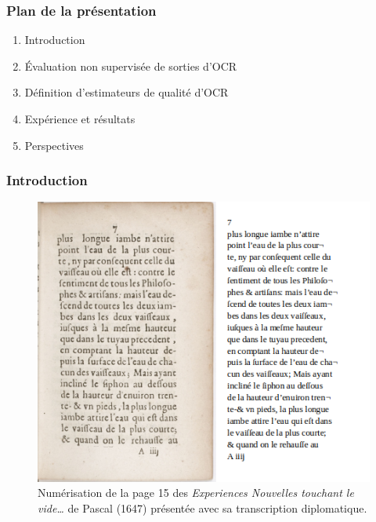 \documentclass{beamer}
\author{Jean-Baptiste Tanguy}
\institute{CELLF, STIH, Sorbonne Université}
\begin{document}
	\begin{frame}
	\maketitle
	\end{frame}

	\begin{frame}
	\frametitle{Plan de la présentation}
	\begin{enumerate}
		\item Introduction
		\item \'{E}valuation non supervisée de sorties d'OCR
		\item Définition d'estimateurs de qualité d'OCR
		\item Expérience et résultats
		\item Perspectives
	\end{enumerate}
	\end{frame}

	\begin{frame}\frametitle{Introduction}
		\begin{figure}[htbp] 
		\begin{center} 
		\includegraphics[scale=0.4]{pascal_15_img_transcription.png}
		\end{center} 
		\caption{Numérisation de la page 15 des \textit{Experiences Nouvelles touchant le vide…} de Pascal (1647) 
		présentée avec sa transcription diplomatique.} \label{pascal}
		\end{figure}
	\end{frame}
\end{document}
